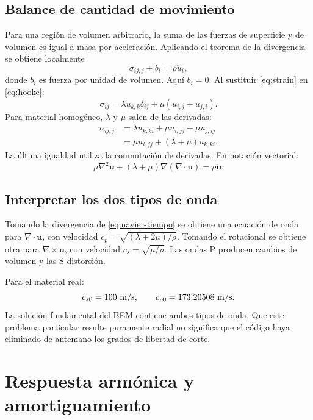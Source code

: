 \documentclass[11pt,a4paper]{report}
\numberwithin{equation}{chapter}
\newcommand{\vect}[1]{\bm{#1}}
\begin{document}
\section{Balance de cantidad de movimiento}
Para una regi\'on de volumen arbitrario, la suma de las fuerzas de
superficie y de volumen es igual a masa por aceleraci\'on.
Aplicando el teorema de la divergencia se obtiene localmente
\begin{equation}
  \sigma_{ij,j}+b_i=\rho\ddot u_i,
\end{equation}
donde $b_i$ es fuerza por unidad de volumen. Aqu\'i $b_i=0$.
Al sustituir \eqref{eq:strain} en \eqref{eq:hooke}:
\begin{equation}
  \sigma_{ij}=\lambda u_{k,k}\delta_{ij}
             +\mu(u_{i,j}+u_{j,i}).
\end{equation}
Para material homog\'eneo, $\lambda$ y $\mu$ salen de las derivadas:
\begin{align}
 \sigma_{ij,j}
   &=\lambda u_{k,ki}+\mu u_{i,jj}+\mu u_{j,ij}\\
   &=\mu u_{i,jj}+(\lambda+\mu)u_{k,ki}.
\end{align}
La \'ultima igualdad utiliza la conmutaci\'on de derivadas.
En notaci\'on vectorial:
\begin{equation}
 \boxed{\mu\nabla^2\vect u+
       (\lambda+\mu)\nabla(\nabla\cdot\vect u)=\rho\ddot{\vect u}.}
 \label{eq:navier-tiempo}
\end{equation}

\section{Interpretar los dos tipos de onda}
Tomando la divergencia de \eqref{eq:navier-tiempo} se obtiene una ecuaci\'on
de onda para $\nabla\cdot\vect u$, con velocidad
$c_p=\sqrt{(\lambda+2\mu)/\rho}$. Tomando el rotacional se obtiene otra
para $\nabla\times\vect u$, con velocidad $c_s=\sqrt{\mu/\rho}$.
Las ondas P producen cambios de volumen y las S distorsi\'on.

Para el material real:
\begin{equation}
 c_{s0}=100\ {\rm m/s},\qquad
 c_{p0}=173.20508\ {\rm m/s}.
\end{equation}
La soluci\'on fundamental del BEM contiene ambos tipos de onda.
Que este problema particular resulte puramente radial no significa que
el c\'odigo haya eliminado de antemano los grados de libertad de corte.

\chapter{Respuesta arm\'onica y amortiguamiento}
\label{ch:armonico}
\end{document}
